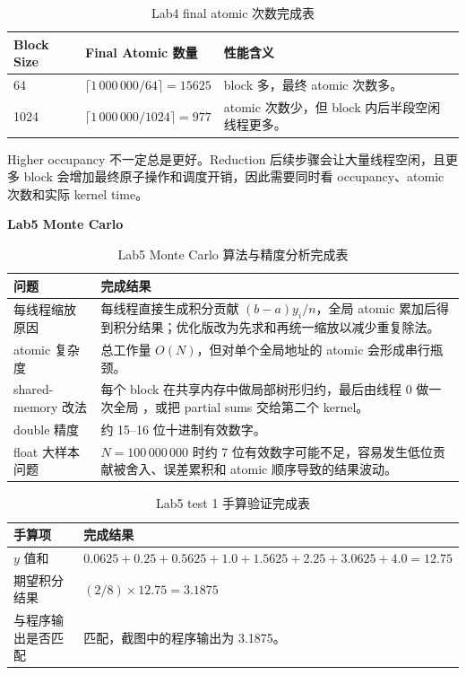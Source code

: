 \documentclass[a4paper,11pt,UTF8]{ctexart}
\newcommand{\code}[1]{\texttt{\detokenize{#1}}}
\begin{document}
\begin{table}[H]
  \centering\footnotesize
  \begin{tabularx}{\textwidth}{p{2.4cm}p{4.0cm}Y}
    \toprule
    Block Size & Final Atomic 数量 & 性能含义 \\
     & $\lceil1\,000\,000/64\rceil=15625$ & block 多，最终 atomic 次数多。 \\
    1024 & $\lceil1\,000\,000/1024\rceil=977$ & atomic 次数少，但 block 内后半段空闲线程更多。 \\
    \bottomrule
  \end{tabularx}
  \caption{Lab4 final atomic 次数完成表}
  \label{tab:hip_l4_atomic}
\end{table}
Higher occupancy 不一定总是更好。Reduction 后续步骤会让大量线程空闲，且更多 block 会增加最终原子操作和调度开销，因此需要同时看 occupancy、atomic 次数和实际 kernel time。

\noindent\textbf{Lab5 Monte Carlo}

\begin{table}[H]
  \centering\footnotesize
  \begin{tabularx}{\textwidth}{p{3.0cm}Y}
    \toprule
    问题 & 完成结果 \\
    \midrule
    每线程缩放原因 & 每线程直接生成积分贡献 $(b-a)y_i/n$，全局 atomic 累加后得到积分结果；优化版改为先求和再统一缩放以减少重复除法。 \\
    atomic 复杂度 & 总工作量 $O(N)$，但对单个全局地址的 atomic 会形成串行瓶颈。 \\
    shared-memory 改法 & 每个 block 在共享内存中做局部树形归约，最后由线程 0 做一次全局 \code{atomicAdd}，或把 partial sums 交给第二个 kernel。 \\
    double 精度 & 约 15--16 位十进制有效数字。 \\
    float 大样本问题 & $N=100\,000\,000$ 时约 7 位有效数字可能不足，容易发生低位贡献被舍入、误差累积和 atomic 顺序导致的结果波动。 \\
    \bottomrule
  \end{tabularx}
  \caption{Lab5 Monte Carlo 算法与精度分析完成表}
  \label{tab:hip_l5_algo}
\end{table}

\begin{table}[H]
  \centering\footnotesize
  \begin{tabularx}{\textwidth}{p{3.2cm}Y}
    \toprule
    手算项 & 完成结果 \\
    \midrule
    $y$ 值和 & $0.0625+0.25+0.5625+1.0+1.5625+2.25+3.0625+4.0=12.75$ \\
    期望积分结果 & $(2/8)\times12.75=3.1875$ \\
    与程序输出是否匹配 & 匹配，截图中的程序输出为 3.1875。 \\
    \bottomrule
  \end{tabularx}
  \caption{Lab5 test 1 手算验证完成表}
  \label{tab:hip_l5_manual}
\end{table}
\end{document}
